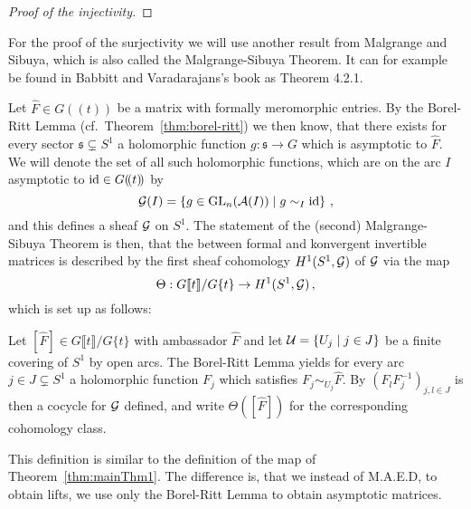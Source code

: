 \begin{proof}[Proof of the injectivity]
\begin{comment}
      $f_j$,$f_j'$ are defined on $U_j$.
      Since $[(f_lf_j^{-1})]=[(f_l'f_j'^{-1})]$ there exists a $0$-cochain
      $(g_j)$ of the sheaf $\Aut^{<0}(\tilde\cM^{nf})$ relative to the covering
      $(I_j)$, such that
      \[
        f_l'f_j'^{-1}=g_lf_lf_j^{-1}g_j^{-1} \text{ on } I_j\cap I_l.
      \]
      If we set $\sigma=f_j^{-1}g_{j}^{-1}f_j'$ on $I_{j}$, we get a horizontal
      section\TODO[~on~???], thus\TODO[why?] it satisfies
      $\sigma\circ\hat{f'}=\hat f$. Therefore are $(\cM,\nabla,\hat f)$ and
      $(\cM',\nabla',\hat{f'})$ isomorphic and injectivity is proven.
    \end{comment}
  \fi
\end{proof}

For the proof of the surjectivity we will use another result from Malgrange and
Sibuya, which is also called the Malgrange-Sibuya Theorem. It can for example
be found in Babbitt and Varadarajans's book \cite[65ff]{babbitt1989local} as
Theorem 4.2.1.

Let $\hat F\in G(\!(t)\!)$ be a matrix with formally meromorphic entries. By
the Borel-Ritt Lemma (cf.\ Theorem~\ref{thm:borel-ritt}) we then know, that
there exists for every sector $\mathfrak{s}\subsetneq S^1$ a holomorphic
function $g:\mathfrak{s}\to G$ which is asymptotic to $\hat F$.
We will denote the set of all such holomorphic functions, which are on
the arc $I$ asymptotic to $\operatorname{id}\in G(\!(t)\!)$ by
\[
  \mathcal{G}(I)=\left\{g\in\operatorname{GL}_n(\mathcal{A}(I))\mid g\sim_I\operatorname{id}\right\}\,,
\]
and this defines a sheaf $\mathcal{G}$ on $S^1$.
The statement of the (second) Malgrange-Sibuya Theorem is then, that the
 between formal and konvergent invertible matrices is
described by the first sheaf cohomology $H^1(S^1,\mathcal{G})$ of $\mathcal{G}$ via the map
\[
  \Theta: G\llbracket t\rrbracket/G\{t\}\to H^1(S^1,\mathcal{G}) \,,
\]
which is set up as follows:
\begin{einr}
  Let $[\hat F]\in G\llbracket t\rrbracket/G\{t\}$ with ambassador $\hat F$ and
  let $\mathcal{U}=\{U_j\mid j\in J\}$ be a finite covering of $S^1$ by open arcs.
  The Borel-Ritt Lemma yields for every arc $j\in J\subsetneq S^1$ a
  holomorphic function $F_j$ which satisfies $F_j\sim_{U_j}\hat F$.
  By $(F_lF_j^{-1})_{j,l\in J}$ is then a cocycle for $\mathcal{G}$ defined,
  and write $\Theta([\hat F])$ for the corresponding cohomology class.
\end{einr}
This definition is similar to the definition of the map of
Theorem~\ref{thm:mainThm1}. The difference is, that we instead of M.A.E.D, to
obtain lifts, we use only the Borel-Ritt Lemma to obtain asymptotic matrices.


